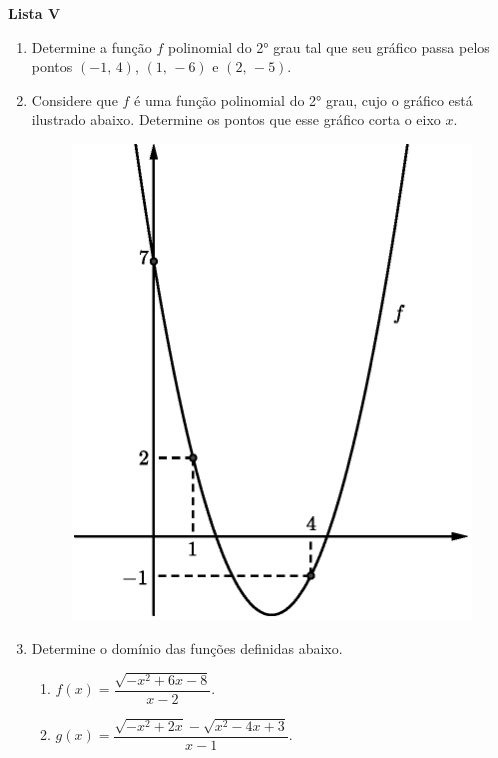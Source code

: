 \documentclass[12pt,a4paper]{article}
\begin{document}
\begin{center}
  \textbf{Lista V}
\end{center}

\begin{enumerate}
  \item Determine a função $f$ polinomial do 2° grau tal que seu gráfico passa
  pelos pontos $(-1,\,4)$, $(1,\,-6)$ e $(2,\,-5)$.
  
  \item Considere que $f$ é uma função polinomial do 2° grau, cujo o gráfico está
  ilustrado abaixo. Determine os pontos que esse gráfico corta o eixo $x$.

  \begin{figure}[H]
   \centering
   \includegraphics[scale=0.625]{figura/grafico-funcao-polinomio-segundo-grau.eps}
  \end{figure}

  \item Determine o domínio das funções definidas abaixo.
  \begin{enumerate}
    \item $f(x) = \dfrac{\sqrt{-x^2 + 6x - 8}}{x - 2}$.
    \item $g(x) = \dfrac{\sqrt{-x^2 + 2x} - \sqrt{x^2 - 4x + 3}}{x - 1}$. 
  \end{enumerate}


\end{enumerate}
\end{document}
